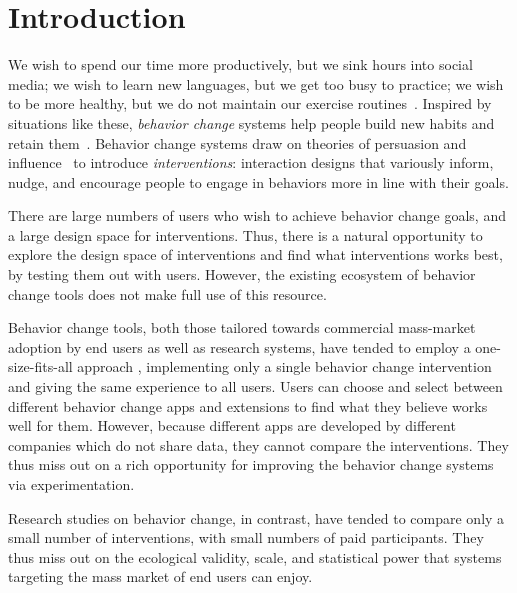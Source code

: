 \chapter{Introduction}

We wish to spend our time more productively, but we sink hours into social media; we wish to learn new languages, but we get too busy to practice; we wish to be more healthy, but we do not maintain our exercise routines~\cite{consolvo2009theory}. Inspired by situations like these, \textit{behavior change} systems help people build new habits and retain them~\cite{consolvo2008activity,froehlich2009ubigreen,kay2012lullaby,kim2016timeaware}. Behavior change systems draw on theories of persuasion and influence~\cite{fogg2002persuasive,cialdini1987influence} to introduce \textit{interventions}: interaction designs that variously inform, nudge, and encourage people to engage in behaviors more in line with their goals.

There are large numbers of users who wish to achieve behavior change goals, and a large design space for interventions. Thus, there is a natural opportunity to explore the design space of interventions and find what interventions works best, by testing them out with users. However, the existing ecosystem of behavior change tools does not make full use of this resource.

Behavior change tools, both those tailored towards commercial mass-market adoption by end users as well as research systems, have tended to employ a one-size-fits-all approach  , implementing only a single behavior change intervention and giving the same experience to all users. Users can choose and select between different behavior change apps and extensions to find what they believe works well for them. However, because different apps are developed by different companies which do not share data, they cannot compare the interventions. They thus miss out on a rich opportunity for improving the behavior change systems via experimentation.

Research studies on behavior change, in contrast, have tended to compare only a small number of interventions, with small numbers of paid participants. They thus miss out on the ecological validity, scale, and statistical power that systems targeting the mass market of end users can enjoy.

